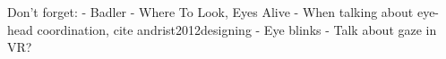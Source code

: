
Don't forget:
- Badler - Where To Look, Eyes Alive
- When talking about eye-head coordination, cite andrist2012designing
- Eye blinks
- Talk about gaze in VR?


